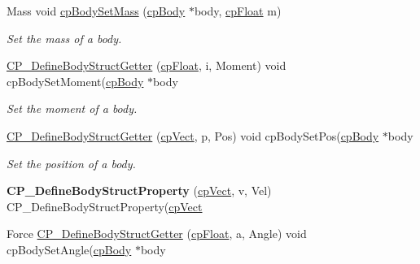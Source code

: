 \begin{DoxyCompactItemize}
\item 
\hypertarget{group__cp_body_gab9c94b87111398a5968f4ce7e94e7ff9}{Mass void \hyperlink{group__cp_body_gab9c94b87111398a5968f4ce7e94e7ff9}{cp\-Body\-Set\-Mass} (\hyperlink{structcp_body}{cp\-Body} $\ast$body, \hyperlink{group__basic_types_gac1ed65573e035bf892505768c852d8d3}{cp\-Float} m)}\label{group__cp_body_gab9c94b87111398a5968f4ce7e94e7ff9}

\begin{DoxyCompactList}\small\item\em Set the mass of a body. \end{DoxyCompactList}\item 
\hypertarget{group__cp_body_ga930b59d1f8ae4688e7b56c9fdacfbbec}{\hyperlink{group__cp_body_ga930b59d1f8ae4688e7b56c9fdacfbbec}{C\-P\-\_\-\-Define\-Body\-Struct\-Getter} (\hyperlink{group__basic_types_gac1ed65573e035bf892505768c852d8d3}{cp\-Float}, i, Moment) void cp\-Body\-Set\-Moment(\hyperlink{structcp_body}{cp\-Body} $\ast$body}\label{group__cp_body_ga930b59d1f8ae4688e7b56c9fdacfbbec}

\begin{DoxyCompactList}\small\item\em Set the moment of a body. \end{DoxyCompactList}\item 
\hypertarget{group__cp_body_ga72fdbae73f60586e69a6af11fd0a3c49}{\hyperlink{group__cp_body_ga72fdbae73f60586e69a6af11fd0a3c49}{C\-P\-\_\-\-Define\-Body\-Struct\-Getter} (\hyperlink{structcp_vect}{cp\-Vect}, p, Pos) void cp\-Body\-Set\-Pos(\hyperlink{structcp_body}{cp\-Body} $\ast$body}\label{group__cp_body_ga72fdbae73f60586e69a6af11fd0a3c49}

\begin{DoxyCompactList}\small\item\em Set the position of a body. \end{DoxyCompactList}\item 
\hypertarget{group__cp_body_ga1ea4ebb9a7e560390eb8fd945eadb9ac}{{\bfseries C\-P\-\_\-\-Define\-Body\-Struct\-Property} (\hyperlink{structcp_vect}{cp\-Vect}, v, Vel) C\-P\-\_\-\-Define\-Body\-Struct\-Property(\hyperlink{structcp_vect}{cp\-Vect}}\label{group__cp_body_ga1ea4ebb9a7e560390eb8fd945eadb9ac}

\item 
\hypertarget{group__cp_body_gab5b6d43e0e8bdfbdad54fddc6cbb7795}{Force \hyperlink{group__cp_body_gab5b6d43e0e8bdfbdad54fddc6cbb7795}{C\-P\-\_\-\-Define\-Body\-Struct\-Getter} (\hyperlink{group__basic_types_gac1ed65573e035bf892505768c852d8d3}{cp\-Float}, a, Angle) void cp\-Body\-Set\-Angle(\hyperlink{structcp_body}{cp\-Body} $\ast$body}\label{group__cp_body_gab5b6d43e0e8bdfbdad54fddc6cbb7795}


\end{DoxyCompactItemize}
